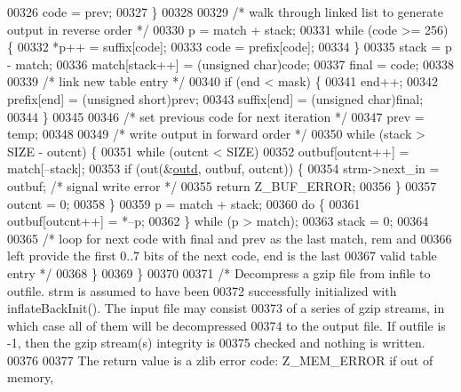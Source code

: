 \begin{DoxyCode}
00326             code = prev;
00327         \}
00328 
00329         \textcolor{comment}{/* walk through linked list to generate output in reverse order */}
00330         p = match + stack;
00331         \textcolor{keywordflow}{while} (code >= 256) \{
00332             *p++ = suffix[code];
00333             code = prefix[code];
00334         \}
00335         stack = p - match;
00336         match[stack++] = (\textcolor{keywordtype}{unsigned} char)code;
00337         \textcolor{keyword}{final} = code;
00338 
00339         \textcolor{comment}{/* link new table entry */}
00340         \textcolor{keywordflow}{if} (end < mask) \{
00341             end++;
00342             prefix[end] = (\textcolor{keywordtype}{unsigned} short)prev;
00343             suffix[end] = (\textcolor{keywordtype}{unsigned} char)\textcolor{keyword}{final};
00344         \}
00345 
00346         \textcolor{comment}{/* set previous code for next iteration */}
00347         prev = temp;
00348 
00349         \textcolor{comment}{/* write output in forward order */}
00350         \textcolor{keywordflow}{while} (stack > SIZE - outcnt) \{
00351             \textcolor{keywordflow}{while} (outcnt < SIZE)
00352                 outbuf[outcnt++] = match[--stack];
00353             \textcolor{keywordflow}{if} (out(&\hyperlink{structoutd}{outd}, outbuf, outcnt)) \{
00354                 strm->next\_in = outbuf; \textcolor{comment}{/* signal write error */}
00355                 \textcolor{keywordflow}{return} Z\_BUF\_ERROR;
00356             \}
00357             outcnt = 0;
00358         \}
00359         p = match + stack;
00360         \textcolor{keywordflow}{do} \{
00361             outbuf[outcnt++] = *--p;
00362         \} \textcolor{keywordflow}{while} (p > match);
00363         stack = 0;
00364 
00365         \textcolor{comment}{/* loop for next code with final and prev as the last match, rem and}
00366 \textcolor{comment}{           left provide the first 0..7 bits of the next code, end is the last}
00367 \textcolor{comment}{           valid table entry */}
00368     \}
00369 \}
00370 
00371 \textcolor{comment}{/* Decompress a gzip file from infile to outfile.  strm is assumed to have been}
00372 \textcolor{comment}{   successfully initialized with inflateBackInit().  The input file may consist}
00373 \textcolor{comment}{   of a series of gzip streams, in which case all of them will be decompressed}
00374 \textcolor{comment}{   to the output file.  If outfile is -1, then the gzip stream(s) integrity is}
00375 \textcolor{comment}{   checked and nothing is written.}
00376 \textcolor{comment}{}
00377 \textcolor{comment}{   The return value is a zlib error code: Z\_MEM\_ERROR if out of memory,}

\end{DoxyCode}
